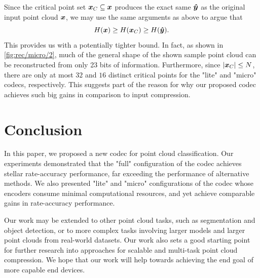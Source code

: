 Since the critical point set ${\boldsymbol{x}}_C \subseteq {\boldsymbol{x}}$ produces the exact same ${\boldsymbol{\hat{y}}}$ as the original input point cloud ${\boldsymbol{x}}$, we may use the same arguments as above to argue that
\[ H({\boldsymbol{x}}) \geq H({\boldsymbol{x}}_C) \geq H({\boldsymbol{\hat{y}}}). \]
This provides us with a potentially tighter bound.
In fact, as shown in \cref{fig:rec/micro/2}, much of the general shape of the shown sample point cloud can be reconstructed from only 23 bits of information.
Furthermore, since $|{\boldsymbol{x}}_C| \leq N$, there are only at most $32$ and $16$ distinct critical points for the "lite" and "micro" codecs, respectively.
This suggests part of the reason for why our proposed codec achieves such big gains in comparison to input compression.




\section{Conclusion}
\label{sec:conclusion}

In this paper, we proposed a new codec for point cloud classification.
Our experiments demonstrated that the "full" configuration of the codec achieves stellar rate-accuracy performance, far exceeding the performance of alternative methods.
We also presented "lite" and "micro" configurations of the codec whose encoders consume minimal computational resources, and yet achieve comparable gains in rate-accuracy performance.

Our work may be extended to other point cloud tasks, such as segmentation and object detection, or to more complex tasks involving larger models and larger point clouds from real-world datasets.
Our work also sets a good starting point for further research into approaches for scalable and multi-task point cloud compression.
We hope that our work will help towards achieving the end goal of more capable end devices.




%
% 
% 
%
%
%


\endgroup
